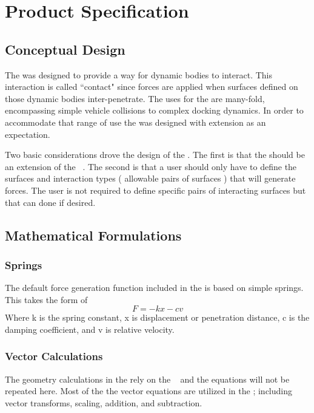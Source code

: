 %
%
%  
%

\chapter{Product Specification}\label{ch:spec}

\section{Conceptual Design}
The \ModelDesc was designed to provide a way for dynamic bodies to interact.  This interaction is called ``contact" since forces are applied when surfaces defined on those dynamic bodies inter-penetrate.  The uses for the \ModelDesc are many-fold, encompassing simple vehicle collisions to complex docking dynamics.  In order to accommodate that range of use the \ModelDesc was designed with extension as an expectation.

Two basic considerations drove the design of the \ModelDesc.  The first is that the \ModelDesc should be an extension of the \SURFACEMODEL~\cite{dynenv:SURFACEMODEL}.  The second is that a user should only have to define the surfaces and interaction types ( allowable pairs of surfaces ) that will generate forces. The user is not required to define specific pairs of interacting surfaces but that can done if desired.

\section{Mathematical Formulations}
\subsection{Springs}
The default force generation function included in the \ModelDesc is based on simple springs.  This takes the form of
\begin{equation}
F = -kx - cv
\label{simple_spring}
\end{equation}
Where k is the spring constant, x is displacement or penetration distance, c is the damping coefficient, and v is relative velocity.

\subsection{Vector Calculations}
The geometry calculations in the \ModelDesc rely on the \MATH~\cite{dynenv:MATH} and the equations will not be repeated here. Most of the the vector equations are utilized in the \ModelDesc; including vector transforms, scaling, addition, and subtraction.

